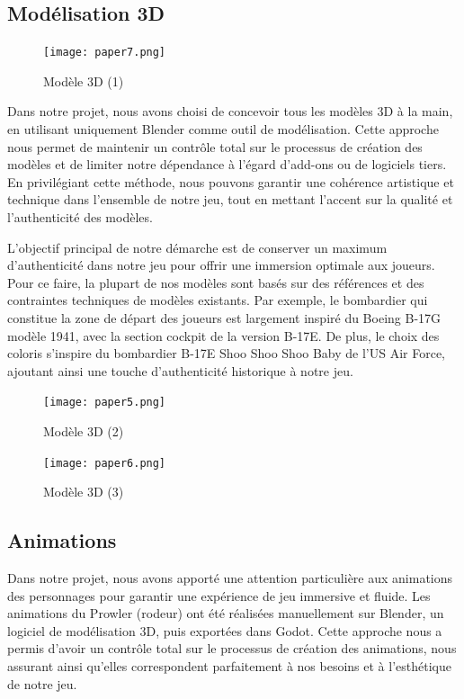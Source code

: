 \documentclass[
	article,			%
	11pt,				%
	oneside,			%
	a4paper,			%
	chapter=TITLE,
	french,			%
	sumario=tradicional
	]{base_nt}
\begin{document}
\subsection{Modélisation 3D}

\begin{figure}[ht]
	\caption{Modèle 3D (1)}
	\centering
	\texttt{[image: paper7.png]}
	\legend{}
	
\end{figure}

Dans notre projet, nous avons choisi de concevoir tous les modèles 3D à la main, en utilisant uniquement Blender comme outil de modélisation. Cette approche nous permet de maintenir un contrôle total sur le processus de création des modèles et de limiter notre dépendance à l'égard d'add-ons ou de logiciels tiers. En privilégiant cette méthode, nous pouvons garantir une cohérence artistique et technique dans l'ensemble de notre jeu, tout en mettant l'accent sur la qualité et l'authenticité des modèles.

L'objectif principal de notre démarche est de conserver un maximum d'authenticité dans notre jeu pour offrir une immersion optimale aux joueurs. Pour ce faire, la plupart de nos modèles sont basés sur des références et des contraintes techniques de modèles existants. Par exemple, le bombardier qui constitue la zone de départ des joueurs est largement inspiré du Boeing B-17G modèle 1941, avec la section cockpit de la version B-17E. De plus, le choix des coloris s'inspire du bombardier B-17E Shoo Shoo Shoo Baby de l'US Air Force, ajoutant ainsi une touche d'authenticité historique à notre jeu.

\begin{figure}[ht]
	\caption{Modèle 3D (2)}
	\centering
	\texttt{[image: paper5.png]}
	\legend{}
	
\end{figure}
\begin{figure}[ht]
	\caption{Modèle 3D (3)}
	\centering
	\texttt{[image: paper6.png]}
	\legend{}
	
\end{figure}

\newpage

\subsection{Animations}

Dans notre projet, nous avons apporté une attention particulière aux animations des personnages pour garantir une expérience de jeu immersive et fluide. Les animations du Prowler (rodeur) ont été réalisées manuellement sur Blender, un logiciel de modélisation 3D, puis exportées dans Godot. Cette approche nous a permis d'avoir un contrôle total sur le processus de création des animations, nous assurant ainsi qu'elles correspondent parfaitement à nos besoins et à l'esthétique de notre jeu.
\end{document}
